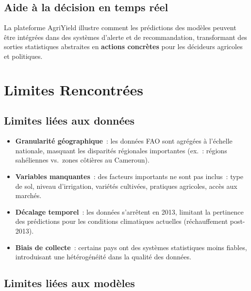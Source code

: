 \subsection{Aide à la décision en temps réel}

La plateforme AgriYield illustre comment les prédictions des modèles peuvent être intégrées dans des systèmes d'alerte et de recommandation, transformant des sorties statistiques abstraites en \textbf{actions concrètes} pour les décideurs agricoles et politiques.

\section{Limites Rencontrées}

\subsection{Limites liées aux données}

\begin{itemize}[leftmargin=1.5cm, itemsep=3pt]
  \item \textbf{Granularité géographique}~: les données FAO sont agrégées à l'échelle nationale, masquant les disparités régionales importantes (ex.~: régions sahéliennes vs.~zones côtières au Cameroun).
  \item \textbf{Variables manquantes}~: des facteurs importants ne sont pas inclus~: type de sol, niveau d'irrigation, variétés cultivées, pratiques agricoles, accès aux marchés.
  \item \textbf{Décalage temporel}~: les données s'arrêtent en 2013, limitant la pertinence des prédictions pour les conditions climatiques actuelles (réchauffement post-2013).
  \item \textbf{Biais de collecte}~: certains pays ont des systèmes statistiques moins fiables, introduisant une hétérogénéité dans la qualité des données.
\end{itemize}

\subsection{Limites liées aux modèles}

